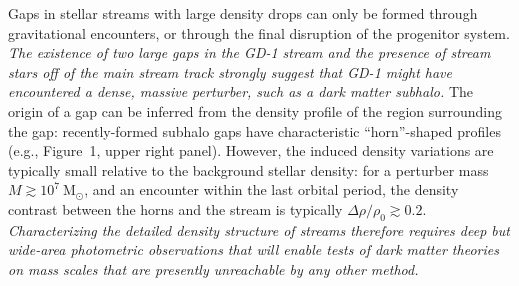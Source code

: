 \documentclass[11pt]{article}
\newcommand{\msun}{\textrm{M}_\odot}
\begin{document}
Gaps in stellar streams with large density drops can only be formed through gravitational encounters, or through the final disruption of the progenitor system.
\emph{The existence of two large gaps in the GD-1 stream and the presence of stream stars off of the main stream track strongly suggest that GD-1 might have encountered a dense, massive perturber, such as a dark matter subhalo.}
The origin of a gap can be inferred from the density profile of the region surrounding the gap: recently-formed subhalo gaps have characteristic ``horn''-shaped profiles (e.g., Figure~1, upper right panel).
However, the induced density variations are typically small relative to the background stellar density: for a perturber mass $M \gtrsim 10^7~\msun$, and an encounter within the last orbital period, the density contrast between the horns and the stream is typically $\Delta\rho/\rho_0 \gtrsim 0.2$.
\emph{Characterizing the detailed density structure of streams therefore requires deep but wide-area photometric observations that will enable tests of dark matter theories on mass scales that are presently unreachable by any other method.}
\end{document}
